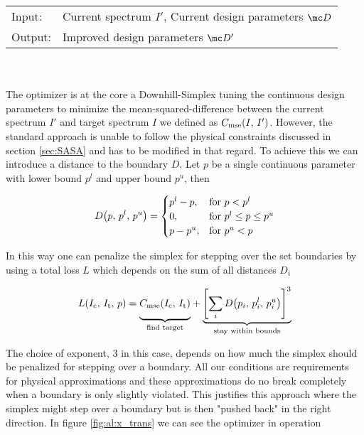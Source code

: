 \begin{tabular}{ll}
    \toprule
    Input: &
    Current spectrum $I'$, 
    Current design parameters $\mc D$\\
    Output: & 
    Improved design parameters $\mc D'$\\
    \bottomrule
\end{tabular}
\\
\\
The optimizer is at the core a Downhill-Simplex \cite{Nelder1965} tuning the continuous design parameters to minimize the mean-squared-difference between the current spectrum $I'$ and target spectrum $I$ we defined as 
$C_{\mathrm{mse}}\qty(I, \, I')$.
However, the standard approach is unable to follow the physical constraints discussed in section \ref{sec:SASA} and has to be modified in that regard. To achieve this we can introduce a distance to the boundary $D$. Let $p$ be a single continuous parameter with lower bound $p^l$ and upper bound $p^u$, then

\begin{equation}
    D\qty(p, \, p^l, \, p^u) =
    \begin{cases}
        p^l - p, & \text{for } p < p^l\\
        0, & \text{for } p^l \leq p \leq p^u\\
        p - p^u, & \text{for } p^u < p
    \end{cases}
\end{equation}

\noindent
In this way one can penalize the simplex for stepping over the set boundaries by using a total loss $L$ which depends on the sum of all distances $D_i$

\begin{equation}\label{eq:al:simlex_loss}
    L(I_\s{c}, \,I_\s{t}, \,p) =
    {\underbrace{%
    \vphantom{ \left(\frac{a^{0.3}}{b}\right) }
    C_\s{mse}(I_\s{c}, \, I_\s{t})}_{\text{find target}}}
    +
    {\underbrace{%
    \qty[\sum_i D\qty(p_i, \, p_i^l, \, p_i^u)]^3
    }_{\text{stay within bounds}}}\\
\end{equation}

The choice of exponent, 3 in this case, depends on how much the simplex should be penalized for stepping over a boundary. All our conditions are requirements for physical approximations and these approximations do no break completely when a boundary is only slightly violated. This justifies this approach where the simplex might step over a boundary but is then "pushed back" in the right direction. In figure \ref{fig:al:x_trans} we can see the optimizer in operation
\\

